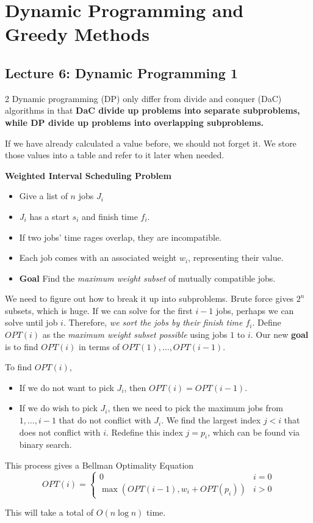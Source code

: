 \pagebreak
\section{Dynamic Programming and Greedy Methods}

\subsection{Lecture 6: Dynamic Programming 1}
\begin{multicols}{2}
Dynamic programming (DP) only differ from divide and conquer (DaC) algorithms in that \textbf{DaC divide up problems into separate subproblems, while DP divide up problems into overlapping subproblems.}

If we have already calculated a value before, we should not forget it. We store those values into a table and refer to it later when needed. 


\begin{leftbar}
\textbf{Weighted Interval Scheduling Problem}
\begin{itemize}
        \item Give a list of $n$ jobs $J_i$
        \item $J_i$ has a start $s_i$ and finish time $f_i$.
        \item If two jobs' time rages overlap, they are incompatible. 
        \item Each job comes with an associated weight $w_i$, representing their value.
        \item \textbf{Goal} Find the \textit{maximum weight subset} of mutually compatible jobs.
    \end{itemize}
\end{leftbar}
\begin{analysis}
    We need to figure out how to break it up into subproblems. Brute force gives $2^n$ subsets, which is huge. If we can solve for the first $i -1$ jobs, perhaps we can solve until job $i$. Therefore, \textit{we sort the jobs by their finish time $f_i$}. Define $OPT(i)$ as the \textit{maximum weight subset possible} using jobs $1$ to $i$. Our new \textbf{goal} is to find $OPT(i)$ in terms of $OPT(1), \ldots, OPT(i - 1)$. 

    To find $OPT(i)$, 
    
    \begin{itemize}
        \item If we do not want to pick $J_i$, then $OPT(i) = OPT(i - 1)$. 
        \item If we do wish to pick $J_i$, then we need to pick the maximum jobs from $1 ,\ldots, i - 1$ that do not conflict with $J_i$. We find the largest index $j < i$ that does not conflict with $i$. Redefine this index $j = p_i$, which can be found via binary search. 
    \end{itemize}
    This process gives a Bellman Optimality Equation 
    $$
    OPT(i) = 
    \begin{cases}
        0 & i = 0 \\
        \max(OPT(i - 1), w_i + OPT(p_i)) & i > 0
    \end{cases}
    $$
\end{analysis}
This will take a total of $O(n \log n)$ time. 


\end{multicols}
